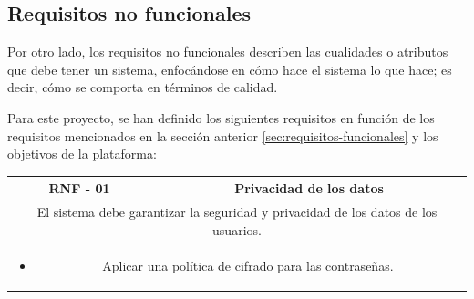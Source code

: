                 \newpage
        
        \subsection{Requisitos no funcionales}
            \label{sec:requisitos-nofuncionales}
            
            Por otro lado, los requisitos no funcionales describen las cualidades o atributos que debe tener un sistema, enfocándose en cómo hace el sistema lo que hace; es decir, cómo se comporta en términos de calidad.
            
            Para este proyecto, se han definido los siguientes requisitos en función de los requisitos mencionados en la sección anterior \ref{sec:requisitos-funcionales} y los objetivos de la plataforma:
            
            \begin{table}[!htbp]
                \centering

                \begin{tabular}{|c|c|}
                    \hline
                    \textbf{RNF - 01} & \textbf{Privacidad de los datos} \\
                    \hline
                    \multicolumn{2}{|p{15cm}|}{
                        El sistema debe garantizar la seguridad y privacidad de los datos de los usuarios.
                    } \\
                    \hline
                    \multicolumn{2}{|p{15cm}|}{
                        \begin{itemize}
                            \item Aplicar una política de cifrado para las contraseñas.
                        \end{itemize}
                        } \\
                    \hline
                \end{tabular}

                \label{tab:RNF1}
            \end{table}
            
